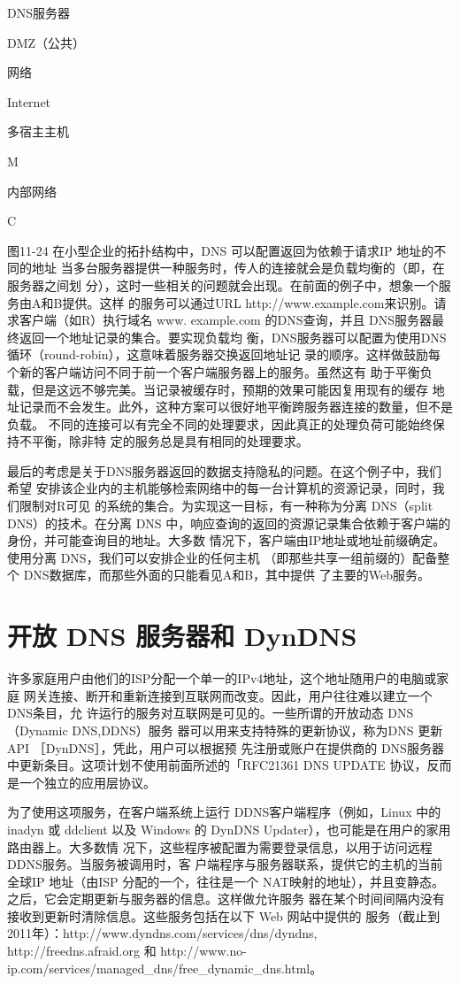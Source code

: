 DNS服务器

DMZ（公共）

网络

Internet

多宿主主机

M

内部网络

C

图11-24 在小型企业的拓扑结构中，DNS 可以配置返回为依赖于请求IP 地址的不同的地址
当多台服务器提供一种服务时，传人的连接就会是负载均衡的（即，在服务器之间划
分），这时一些相关的问题就会出现。在前面的例子中，想象一个服务由A和B提供。这样
的服务可以通过URL http://www.example.com来识别。请求客户端（如R）执行域名 www.
example.com 的DNS查询，并且 DNS服务器最终返回一个地址记录的集合。要实现负载均
衡，DNS服务器可以配置为使用DNS循环（round-robin），这意味着服务器交换返回地址记
录的顺序。这样做鼓励每个新的客户端访问不同于前一个客户端服务器上的服务。虽然这有
助于平衡负载，但是这远不够完美。当记录被缓存时，预期的效果可能因复用现有的缓存
地址记录而不会发生。此外，这种方案可以很好地平衡跨服务器连接的数量，但不是负载。
不同的连接可以有完全不同的处理要求，因此真正的处理负荷可能始终保持不平衡，除非特
定的服务总是具有相同的处理要求。

最后的考虑是关于DNS服务器返回的数据支持隐私的问题。在这个例子中，我们希望
安排该企业内的主机能够检索网络中的每一台计算机的资源记录，同时，我们限制对R可见
的系统的集合。为实现这一目标，有一种称为分离 DNS（split DNS）的技术。在分离 DNS
中，响应查询的返回的资源记录集合依赖于客户端的身份，并可能查询目的地址。大多数
情况下，客户端由IP地址或地址前缀确定。使用分离 DNS，我们可以安排企业的任何主机
（即那些共享一组前缀的）配备整个 DNS数据库，而那些外面的只能看见A和B，其中提供
了主要的Web服务。

\section{开放 DNS 服务器和 DynDNS}

许多家庭用户由他们的ISP分配一个单一的IPv4地址，这个地址随用户的电脑或家庭
网关连接、断开和重新连接到互联网而改变。因此，用户往往难以建立一个 DNS条目，允
许运行的服务对互联网是可见的。一些所谓的开放动态 DNS（Dynamic DNS,DDNS）服务
器可以用来支持特殊的更新协议，称为DNS 更新 API ［DynDNS］，凭此，用户可以根据预
先注册或账户在提供商的 DNS服务器中更新条目。这项计划不使用前面所述的「RFC21361
DNS UPDATE 协议，反而是一个独立的应用层协议。

为了使用这项服务，在客户端系统上运行 DDNS客户端程序（例如，Linux 中的 inadyn
或 ddclient 以及 Windows 的 DynDNS Updater），也可能是在用户的家用路由器上。大多数情
况下，这些程序被配置为需要登录信息，以用于访问远程DDNS服务。当服务被调用时，客
户端程序与服务器联系，提供它的主机的当前全球IP 地址（由ISP 分配的一个，往往是一个
NAT映射的地址），并且变静态。之后，它会定期更新与服务器的信息。这样做允许服务
器在某个时间间隔内没有接收到更新时清除信息。这些服务包括在以下 Web 网站中提供的
服务（截止到2011年）：http://www.dyndns.com/services/dns/dyndns, http://freedns.afraid.org
和 http://www.no-ip.com/services/managed\_dns/free\_dynamic\_dns.html。

